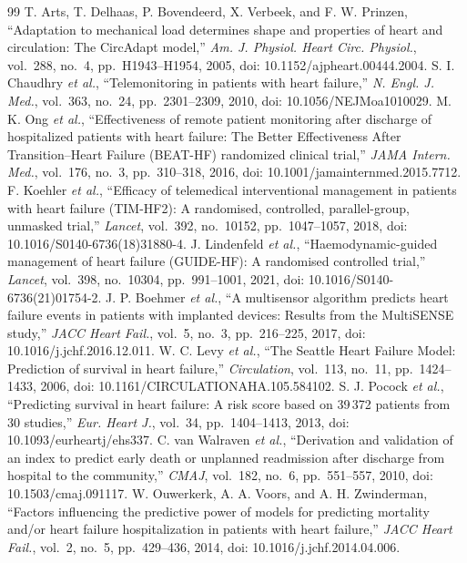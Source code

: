 \documentclass[conference]{IEEEtran}
\begin{document}
\begin{thebibliography}{99}
 T. Arts, T. Delhaas, P. Bovendeerd, X. Verbeek, and F. W. Prinzen, ``Adaptation to mechanical load determines shape and properties of heart and circulation: The CircAdapt model,'' \textit{Am. J. Physiol. Heart Circ. Physiol.}, vol.~288, no.~4, pp.~H1943--H1954, 2005, doi: 10.1152/ajpheart.00444.2004.
 S. I. Chaudhry \textit{et al.}, ``Telemonitoring in patients with heart failure,'' \textit{N. Engl. J. Med.}, vol.~363, no.~24, pp.~2301--2309, 2010, doi: 10.1056/NEJMoa1010029.
 M. K. Ong \textit{et al.}, ``Effectiveness of remote patient monitoring after discharge of hospitalized patients with heart failure: The Better Effectiveness After Transition--Heart Failure (BEAT-HF) randomized clinical trial,'' \textit{JAMA Intern. Med.}, vol.~176, no.~3, pp.~310--318, 2016, doi: 10.1001/jamainternmed.2015.7712.
 F. Koehler \textit{et al.}, ``Efficacy of telemedical interventional management in patients with heart failure (TIM-HF2): A randomised, controlled, parallel-group, unmasked trial,'' \textit{Lancet}, vol.~392, no.~10152, pp.~1047--1057, 2018, doi: 10.1016/S0140-6736(18)31880-4.
 J. Lindenfeld \textit{et al.}, ``Haemodynamic-guided management of heart failure (GUIDE-HF): A randomised controlled trial,'' \textit{Lancet}, vol.~398, no.~10304, pp.~991--1001, 2021, doi: 10.1016/S0140-6736(21)01754-2.
 J. P. Boehmer \textit{et al.}, ``A multisensor algorithm predicts heart failure events in patients with implanted devices: Results from the MultiSENSE study,'' \textit{JACC Heart Fail.}, vol.~5, no.~3, pp.~216--225, 2017, doi: 10.1016/j.jchf.2016.12.011.
 W. C. Levy \textit{et al.}, ``The Seattle Heart Failure Model: Prediction of survival in heart failure,'' \textit{Circulation}, vol.~113, no.~11, pp.~1424--1433, 2006, doi: 10.1161/CIRCULATIONAHA.105.584102.
 S. J. Pocock \textit{et al.}, ``Predicting survival in heart failure: A risk score based on 39\,372 patients from 30 studies,'' \textit{Eur. Heart J.}, vol.~34, pp.~1404--1413, 2013, doi: 10.1093/eurheartj/ehs337.
 C. van Walraven \textit{et al.}, ``Derivation and validation of an index to predict early death or unplanned readmission after discharge from hospital to the community,'' \textit{CMAJ}, vol.~182, no.~6, pp.~551--557, 2010, doi: 10.1503/cmaj.091117.
 W. Ouwerkerk, A. A. Voors, and A. H. Zwinderman, ``Factors influencing the predictive power of models for predicting mortality and/or heart failure hospitalization in patients with heart failure,'' \textit{JACC Heart Fail.}, vol.~2, no.~5, pp.~429--436, 2014, doi: 10.1016/j.jchf.2014.04.006.

\end{thebibliography}
\end{document}
